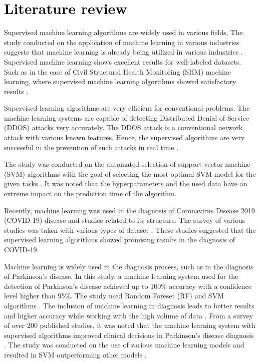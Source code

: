 \documentclass[a4paper,fleqn]{cas-dc}
\newcommand{\responsemod}{\color{black}}
\newcommand{\responsemodsm}[1]{\textcolor{black}{#1}}
\newcommand{\sectionb}[1]{\section{\responsemodsm{#1}}}
\begin{document}
\sectionb{Literature review}\label{sec:literature_review}

{\responsemod
Supervised machine learning algorithms are widely used in various fields. The study conducted on the application of machine learning in various industries suggests that machine learning is already being utilized in various industries \cite{ref_paper_14}. Supervised machine learning shows excellent results for well-labeled datasets. Such as in the case of Civil Structural Health Monitoring (SHM) machine learning, where supervised machine learning algorithms showed satisfactory results \cite{ref_paper_6}.

    Supervised learning algorithms are very efficient for conventional problems. The machine learning systems are capable of detecting Distributed Denial of Service (DDOS) attacks very accurately. The DDOS attack is a conventional network attack with various known features. Hence, the supervised algorithms are very successful in the prevention of such attacks in real time \cite{ref_paper_9}.
    
    The study was conducted on the automated selection of support vector machine (SVM) algorithms with the goal of selecting the most optimal SVM model for the given tasks \cite{ref_paper_2}. It was noted that the hyperparameters and the used data have an extreme impact on the prediction time of the algorithm.
    
    Recently, machine learning was used in the diagnosis of Coronavirus Disease 2019 (COVID-19) disease and studies related to its structure. The survey of various studies was taken with various types of dataset \cite{ref_paper_20}. These studies suggested that the supervised learning algorithms showed promising results in the diagnosis of COVID-19.
    
    Machine learning is widely used in the diagnosis process, such as in the diagnosis of Parkinson's disease. In this study, a machine learning system used for the detection of Parkinson's disease achieved up to 100\% accuracy with a confidence level higher than 95\%. The study used Random Foreset (RF) and SVM algorithms \cite{ref_paper_34}. The inclusion of machine learning in diagnosis leads to better results and higher accuracy while working with the high volume of data \cite{ref_paper_15}. From a survey of over 200 published studies, it was noted that the machine learning system with supervised algorithms improved clinical decisions in Parkinson's disease diagnosis \cite{ref_paper_27}. The study was conducted on the use of various machine learning models and resulted in SVM outperforming other models \cite{ref_paper_30}.
    
}
\end{document}
